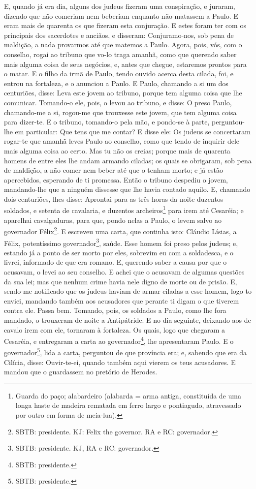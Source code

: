 E, quando já era dia, alguns dos judeus fizeram uma conspiração,
e juraram, dizendo que não comeriam nem beberiam enquanto não
matassem a Paulo. E eram mais de quarenta os que fizeram esta
conjuração. E estes foram ter com os principais dos
sacerdotes e anciãos, e disseram: Conjuramo-nos, sob pena de
maldição, a nada provarmos até que matemos a Paulo. Agora,
pois, vós, com o conselho, rogai ao tribuno que vo-lo traga amanhã,
como que querendo saber mais alguma coisa de seus negócios, e, antes
que chegue, estaremos prontos para o matar. E o filho da irmã
de Paulo, tendo ouvido acerca desta cilada, foi, e entrou na
fortaleza, e o anunciou a Paulo. E Paulo, chamando a si um
dos centuriões, disse: Leva este jovem ao tribuno, porque tem alguma
coisa que lhe comunicar. Tomando-o ele, pois, o levou ao
tribuno, e disse: O preso Paulo, chamando-me a si, rogou-me que
trouxesse este jovem, que tem alguma coisa para dizer-te. E o
tribuno, tomando-o pela mão, e pondo-se à parte, perguntou-lhe em
particular: Que tens que me contar? E disse ele: Os judeus se
concertaram rogar-te que amanhã leves Paulo ao conselho, como que
tendo de inquirir dele mais alguma coisa ao certo. Mas tu não
os creias; porque mais de quarenta homens de entre eles lhe andam
armando ciladas; os quais se obrigaram, sob pena de maldição, a não
comer nem beber até que o tenham morto; e já estão apercebidos,
esperando de ti promessa. Então o tribuno despediu o jovem,
mandando-lhe que a ninguém dissesse que lhe havia contado aquilo.
E, chamando dois centuriões, lhes disse: Aprontai para as
três horas da noite duzentos soldados, e setenta de cavalaria, e
duzentos archeiros\footnote{Guarda do paço; alabardeiro (alabarda =
arma antiga, constituída de uma longa haste de madeira rematada em
ferro largo e pontiagudo, atravessado por outro em forma de
meia-lua).} para irem até Cesaréia; e aparelhai cavalgaduras,
para que, pondo nelas a Paulo, o levem salvo ao governador
Félix\footnote{SBTB: presidente. KJ: Felix the governor. RA e RC:
governador.}. E escreveu uma carta, que continha isto:
Cláudio Lísias, a Félix, potentíssimo
governador\footnote{SBTB: presidente. KJ, RA e RC: governador.},
saúde. Esse homem foi preso pelos judeus; e, estando já a
ponto de ser morto por eles, sobrevim eu com a soldadesca, e o
livrei, informado de que era romano. E, querendo saber a
causa por que o acusavam, o levei ao seu conselho. E achei
que o acusavam de algumas questões da sua lei; mas que nenhum crime
havia nele digno de morte ou de prisão. E, sendo-me
notificado que os judeus haviam de armar ciladas a esse homem, logo
to enviei, mandando também aos acusadores que perante ti digam o que
tiverem contra ele. Passa bem. Tomando, pois, os soldados a
Paulo, como lhe fora mandado, o trouxeram de noite a Antipátride.
E no dia seguinte, deixando aos de cavalo irem com ele,
tornaram à fortaleza. Os quais, logo que chegaram a Cesaréia,
e entregaram a carta ao governador\footnote{SBTB: presidente.}, lhe
apresentaram Paulo. E o governador\footnote{SBTB:
presidente.}, lida a carta, perguntou de que província era; e,
sabendo que era da Cilícia, disse: Ouvir-te-ei, quando também
aqui vierem os teus acusadores. E mandou que o guardassem no
pretório de Herodes.

